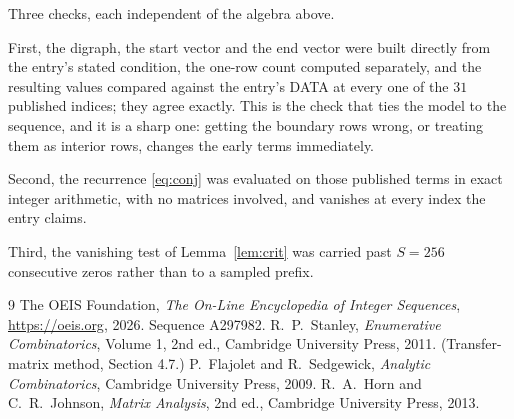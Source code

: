 \documentclass[11pt,a4paper]{article}
\theoremstyle{plain}
\theoremstyle{definition}
\begin{document}
Three checks, each independent of the algebra above.

First, the digraph, the start vector and the end vector were built directly from the
entry's stated condition, the one-row count computed separately, and the resulting values
compared against the entry's DATA at every one of the $31$ published indices; they
agree exactly. This is the check that ties the model to the sequence, and it is a sharp one:
getting the boundary rows wrong, or treating them as interior rows, changes the early terms
immediately.

Second, the recurrence \eqref{eq:conj} was evaluated on those published terms in exact
integer arithmetic, with no matrices involved, and vanishes at every index the entry claims.

Third, the vanishing test of Lemma~\ref{lem:crit} was carried past $S=256$ consecutive
zeros rather than to a sampled prefix.

\begin{thebibliography}{9}
 The OEIS Foundation, \emph{The On-Line Encyclopedia of Integer
Sequences}, \url{https://oeis.org}, 2026. Sequence A297982.
 R.~P.~Stanley, \emph{Enumerative Combinatorics}, Volume 1, 2nd ed.,
Cambridge University Press, 2011. (Transfer-matrix method, Section 4.7.)
 P.~Flajolet and R.~Sedgewick, \emph{Analytic Combinatorics}, Cambridge
University Press, 2009.
 R.~A.~Horn and C.~R.~Johnson, \emph{Matrix Analysis}, 2nd ed., Cambridge
University Press, 2013.
\end{thebibliography}
\end{document}
